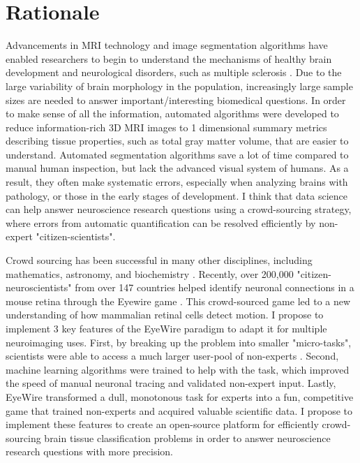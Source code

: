 \section*{Rationale}

Advancements in MRI technology and image segmentation algorithms have enabled researchers to begin to understand the mechanisms of healthy brain development \cite{giedd1999brain} and neurological disorders, such as multiple sclerosis \cite{bakshi2008mri}. Due to the large variability of brain morphology in the population, increasingly large sample sizes are needed to answer important/interesting biomedical questions. In order to make sense of all the information, automated algorithms were developed to reduce information-rich 3D MRI images to 1 dimensional summary metrics describing tissue properties, such as total gray matter volume, that are easier to understand. Automated  segmentation algorithms save a lot of time compared to manual human inspection, but lack the advanced visual system of humans. As a result, they often make systematic errors, especially when analyzing brains with pathology, or those in the early stages of development. I think that data science can help answer neuroscience research questions using a crowd-sourcing strategy, where errors from automatic quantification can be resolved efficiently by non-expert "citizen-scientists".

Crowd sourcing has been successful in many other disciplines, including mathematics, astronomy, and biochemistry \cite{wiggins2011conservation}. Recently, over 200,000 "citizen-neuroscientists"  from over 147 countries helped identify neuronal connections in a mouse retina through the Eyewire game \cite{kim2014space}. This crowd-sourced game led to a new understanding of how mammalian retinal cells detect motion. I propose to implement 3 key features of the EyeWire paradigm to adapt it for multiple neuroimaging uses. First, by breaking up the problem into smaller "micro-tasks", scientists were able to access a much larger user-pool of non-experts \cite{kittur2008crowdsourcing}. Second, machine learning algorithms were trained to help with the task, which improved the speed of manual neuronal tracing and validated non-expert input. Lastly, EyeWire transformed a dull, monotonous task for experts into a fun, competitive game that trained non-experts and acquired valuable scientific data. I propose to implement these features to create an open-source platform for efficiently crowd-sourcing brain tissue classification problems in order to answer neuroscience research questions with more precision.

